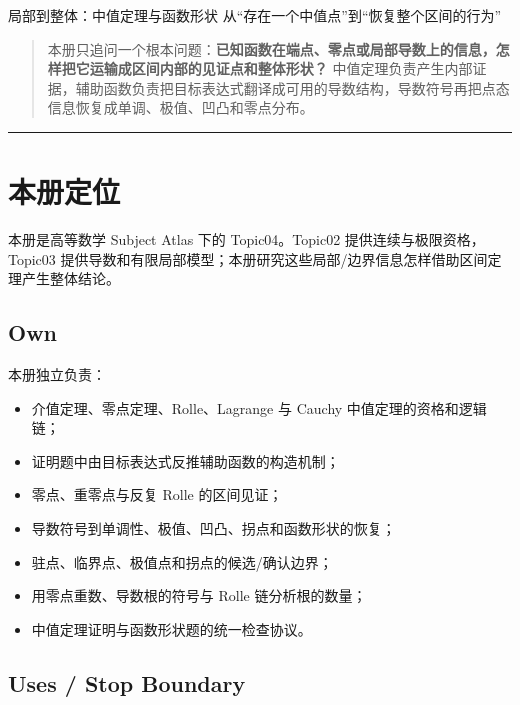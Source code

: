 \documentclass[UTF8,fontset=none,11pt,a4paper]{ctexart}
\begin{document}
\handbooktitle
  {局部到整体：中值定理与函数形状}
  {从“存在一个中值点”到“恢复整个区间的行为”}
  {}

\begin{quote}
本册只追问一个根本问题：\textbf{已知函数在端点、零点或局部导数上的信息，怎样把它运输成区间内部的见证点和整体形状？} 中值定理负责产生内部证据，辅助函数负责把目标表达式翻译成可用的导数结构，导数符号再把点态信息恢复成单调、极值、凹凸和零点分布。
\end{quote}

\begin{center}\rule{0.5\linewidth}{0.5pt}\end{center}

\setcounter{section}{-1}
\section{本册定位}

本册是高等数学 Subject Atlas 下的 Topic04。Topic02 提供连续与极限资格，Topic03 提供导数和有限局部模型；本册研究这些局部/边界信息怎样借助区间定理产生整体结论。

\subsection{Own}

本册独立负责：
\begin{itemize}
  \item 介值定理、零点定理、Rolle、Lagrange 与 Cauchy 中值定理的资格和逻辑链；
  \item 证明题中由目标表达式反推辅助函数的构造机制；
  \item 零点、重零点与反复 Rolle 的区间见证；
  \item 导数符号到单调性、极值、凹凸、拐点和函数形状的恢复；
  \item 驻点、临界点、极值点和拐点的候选/确认边界；
  \item 用零点重数、导数根的符号与 Rolle 链分析根的数量；
  \item 中值定理证明与函数形状题的统一检查协议。
\end{itemize}

\subsection{Uses / Stop Boundary}
\end{document}
